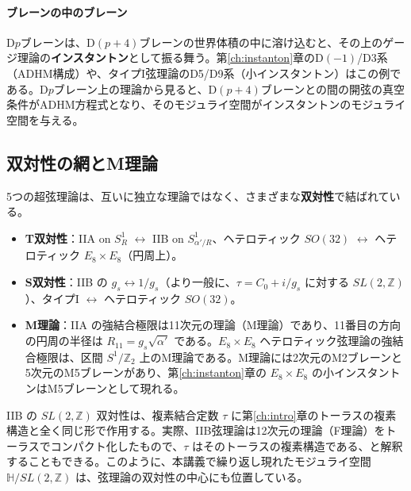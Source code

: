\documentclass[uplatex, dvipdfmx, book]{jsbook}
\let\origsubsection\subsection
\let\origsubsubsection\subsubsection
\renewcommand{\section}{\origsubsection}
\renewcommand{\subsection}{\origsubsubsection}
\renewcommand{\subsubsection}{\paragraph}
\begin{document}
\paragraph{ブレーンの中のブレーン}
D$p$ブレーンは、D$(p+4)$ブレーンの世界体積の中に溶け込むと、その上のゲージ理論の\textbf{インスタントン}として振る舞う。第\ref{ch:instanton}章のD$(-1)$/D3系（ADHM構成）や、タイプI弦理論のD5/D9系（小インスタントン）はこの例である。D$p$ブレーン上の理論から見ると、D$(p+4)$ブレーンとの間の開弦の真空条件がADHM方程式となり、そのモジュライ空間がインスタントンのモジュライ空間を与える。

\section{双対性の網とM理論}

5つの超弦理論は、互いに独立な理論ではなく、さまざまな\textbf{双対性}で結ばれている。
\begin{itemize}
    \item \textbf{T双対性}：IIA on $S^1_R$ $\leftrightarrow$ IIB on $S^1_{\alpha'/R}$、ヘテロティック $SO(32)$ $\leftrightarrow$ ヘテロティック $E_8 \times E_8$（円周上）。
    \item \textbf{S双対性}：IIB の $g_s \leftrightarrow 1/g_s$（より一般に、$\tau = C_0 + i/g_s$ に対する $SL(2, \mathbb{Z})$）、タイプI $\leftrightarrow$ ヘテロティック $SO(32)$。
    \item \textbf{M理論}：IIA の強結合極限は11次元の理論（M理論）であり、11番目の方向の円周の半径は $R_{11} = g_s\sqrt{\alpha'}$ である。$E_8 \times E_8$ ヘテロティック弦理論の強結合極限は、区間 $S^1/\mathbb{Z}_2$ 上のM理論である。M理論には2次元のM2ブレーンと5次元のM5ブレーンがあり、第\ref{ch:instanton}章の $E_8 \times E_8$ の小インスタントンはM5ブレーンとして現れる。
\end{itemize}
IIB の $SL(2, \mathbb{Z})$ 双対性は、複素結合定数 $\tau$ に第\ref{ch:intro}章のトーラスの複素構造と全く同じ形で作用する。実際、IIB弦理論は12次元の理論（F理論）をトーラスでコンパクト化したもので、$\tau$ はそのトーラスの複素構造である、と解釈することもできる。このように、本講義で繰り返し現れたモジュライ空間 $\mathbb{H}/SL(2, \mathbb{Z})$ は、弦理論の双対性の中心にも位置している。



\end{document}
